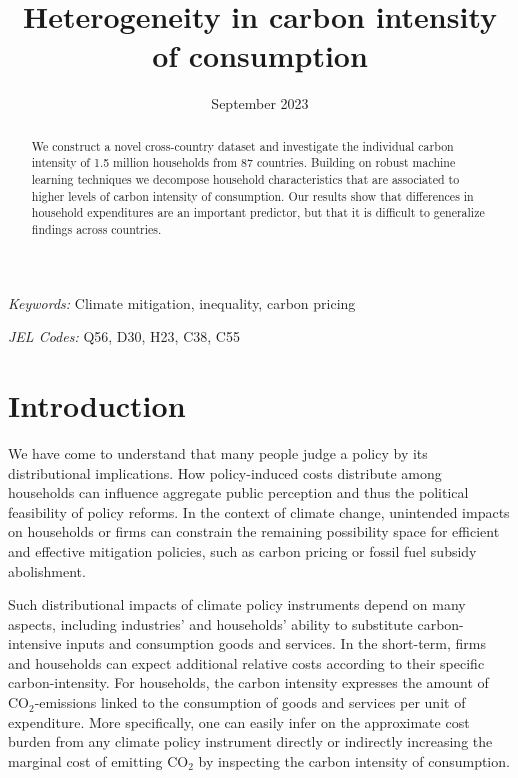 \documentclass[12pt, a4paper]{article}
\title{Heterogeneity in carbon intensity of consumption}
\date{September 2023}
\begin{document}
\maketitle
\begin{abstract}
  We construct a novel cross-country dataset and investigate the individual carbon intensity of 1.5 million households from 87 countries. Building on robust machine learning techniques we decompose household characteristics that are associated to higher levels of carbon intensity of consumption. Our results show that differences in household expenditures are an important predictor, but that it is difficult to generalize findings across countries. 
\end{abstract}

\smallskip

\noindent \small \textit{Keywords:} Climate mitigation, inequality, carbon pricing

\noindent \small \textit{JEL Codes:} Q56, D30, H23, C38, C55

\thispagestyle{empty}
\clearpage
\setcounter{page}{1}

\section{Introduction} \label{sec:introduction}

We have come to understand that many people judge a policy by its distributional implications. How policy-induced costs distribute among households can influence aggregate public perception and thus the political feasibility of policy reforms. In the context of climate change, unintended impacts on households or firms can constrain the remaining possibility space for efficient and effective mitigation policies, such as carbon pricing or fossil fuel subsidy abolishment.


Such distributional impacts of climate policy instruments depend on many aspects, including industries' and households' ability to substitute carbon-intensive inputs and consumption goods and services. In the short-term, firms and households can expect additional relative costs according to their specific carbon-intensity. For households, the carbon intensity expresses the amount of CO$_{2}$-emissions linked to the consumption of goods and services per unit of expenditure. More specifically, one can easily infer on the approximate cost burden from any climate policy instrument directly or indirectly increasing the marginal cost of emitting CO$_{2}$ by inspecting the carbon intensity of consumption.
\end{document}
